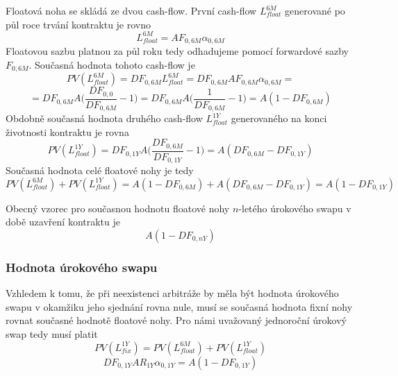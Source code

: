 \documentclass[a4paper]{book}
\begin{document}
Floatová noha se skládá ze dvou cash-flow. První cash-flow $L_{float}^{6M}$ generované po půl roce trvání kontraktu je rovno
\begin{equation*}
L_{float}^{6M} = A F_{0,6M} \alpha_{0,6M}
\end{equation*}
Floatovou sazbu platnou za půl roku tedy odhadujeme pomocí forwardové sazby $F_{0,6M}$. Současná hodnota tohoto cash-flow je
\begin{equation*}
PV(L_{float}^{6M}) = DF_{0,6M} L_{float}^{6M} = DF_{0,6M} A F_{0,6M} \alpha_{0,6M} =
\end{equation*}
\begin{equation*}
= DF_{0,6M} A \bigg( \frac{DF_{0,0}}{DF_{0,6M}} - 1 \bigg) = DF_{0,6M} A \bigg( \frac{1}{DF_{0,6M}} - 1 \bigg) = A (1 - DF_{0,6M})
\end{equation*}
Obdobně současná hodnota druhého cash-flow $L_{float}^{1Y}$ generovaného na konci životnosti kontraktu je rovna
\begin{equation*}
PV(L_{float}^{1Y}) = DF_{0,1Y} A \bigg( \frac{DF_{0,6M}}{DF_{0,1Y}} - 1 \bigg) = A (DF_{0,6M} - DF_{0,1Y})
\end{equation*}
Současná hodnota celé floatové nohy je tedy
\begin{equation*}
PV(L_{float}^{6M}) + PV(L_{float}^{1Y}) = A (1 - DF_{0,6M}) + A (DF_{0,6M} - DF_{0,1Y}) = A (1 - DF_{0,1Y})
\end{equation*}

Obecný vzorec pro současnou hodnotu floatové nohy $n$-letého úrokového swapu v době uzavření kontraktu je
\begin{equation}
A(1 - DF_{0,nY})
\end{equation}

\subsubsection{Hodnota úrokového swapu}

Vzhledem k tomu, že při neexistenci arbitráže by měla být hodnota úrokového swapu v okamžiku jeho sjednání rovna nule, musí se současná hodnota fixní nohy rovnat současné hodnotě floatové nohy. Pro námi uvažovaný jednoroční úrokový swap tedy musí platit
\begin{equation*}
PV(L_{fix}^{1Y}) = PV(L_{float}^{6M}) + PV(L_{float}^{1Y}) 
\end{equation*}
\begin{equation}
DF_{0, 1Y} A R_{1Y} \alpha_{0,1Y} = A (1 - DF_{0,1Y})
\end{equation}
\end{document}

